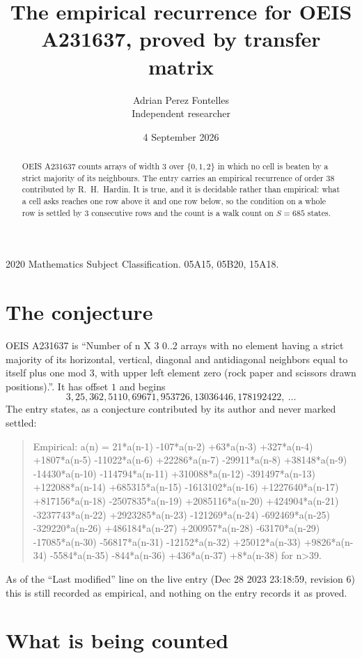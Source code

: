 \documentclass[11pt,a4paper]{article}
\title{The empirical recurrence for OEIS A231637, proved by transfer matrix}
\author{Adrian Perez Fontelles\\ \small Independent researcher}
\date{4 September 2026}
\theoremstyle{plain}
\theoremstyle{definition}
\begin{document}
\maketitle

\begin{abstract}
OEIS A231637 counts arrays of width $3$ over $\{0,1,2\}$ in which no cell is beaten by a strict majority of its neighbours. The entry carries an
empirical recurrence of order $38$ contributed by R.~H.~Hardin. It is true, and it is
decidable rather than empirical: what a cell asks reaches one row above
it and one row below, so the condition on a whole row is settled by
$3$ consecutive rows and the count is a walk count on $S=685$ states.
\end{abstract}

\noindent\small 2020 Mathematics Subject Classification. 05A15, 05B20, 15A18.\normalsize

\section{The conjecture}

OEIS A231637 is ``Number of n X 3 0..2 arrays with no element having a strict majority of its horizontal, vertical, diagonal and antidiagonal neighbors equal to itself plus one mod 3, with upper left element zero (rock paper and scissors drawn positions).''. It has offset $1$ and begins
\[
3, 25, 362, 5110, 69671, 953726, 13036446, 178192422,\ \dots
\]
The entry states, as a conjecture contributed by its author and never marked settled:
\begin{quote}
Empirical: a(n) = 21*a(n-1) -107*a(n-2) +63*a(n-3) +327*a(n-4) +1807*a(n-5) -11022*a(n-6) +22286*a(n-7) -29911*a(n-8) +38148*a(n-9) -14430*a(n-10) -114794*a(n-11) +310088*a(n-12) -391497*a(n-13) +122088*a(n-14) +685315*a(n-15) -1613102*a(n-16) +1227640*a(n-17) +817156*a(n-18) -2507835*a(n-19) +2085116*a(n-20) +424904*a(n-21) -3237743*a(n-22) +2923285*a(n-23) -121269*a(n-24) -692469*a(n-25) -329220*a(n-26) +486184*a(n-27) +200957*a(n-28) -63170*a(n-29) -17085*a(n-30) -56817*a(n-31) -12152*a(n-32) +25012*a(n-33) +9826*a(n-34) -5584*a(n-35) -844*a(n-36) +436*a(n-37) +8*a(n-38) for n>39.
\end{quote}
As of the ``Last modified'' line on the live entry (Dec 28 2023 23:18:59, revision 6) this is still
recorded as empirical, and nothing on the entry records it as proved.

\section{What is being counted}
\end{document}
